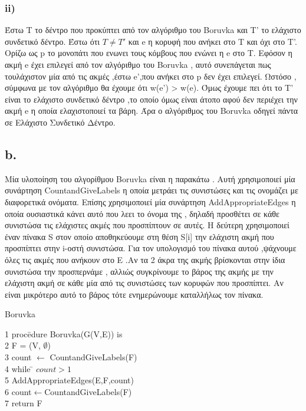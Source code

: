 \documentclass[12pt,a4paper]{article}
\begin{document}
\subsubsection*{ii)}

Έστω Τ το δέντρο που προκύπτει από τον αλγόριθμο του Boruvka και Τ' το ελάχιστο συνδετικό δέντρο. Έστω ότι $Τ \ne T'$ και e η κορυφή που ανήκει στο Τ και όχι στο Τ'. Ορίζω ως p το μονοπάτι που ενωνει τους κόμβους που ενώνει η e στο Τ. Εφόσον η ακμή e έχει επιλεγεί από τον αλγόριθμο του Boruvka , αυτό συνεπάγεται πως τουλάχιστον μία από τις ακμές ,έστω e',που ανήκει στο p δεν έχει επιλεγεί. Ωστόσο , σύμφωνα με τον αλγόριθμο θα έχουμε ότι w(e') > w(e). Όμως έχουμε πει ότι το Τ' είναι το ελάχιστο συνδετικό δέντρο ,το οποίο όμως είναι άτοπο αφού δεν περιέχει την ακμή e η οποία ελαχιστοποιεί τα βάρη. Άρα ο αλγόριθμος του Boruvka οδηγεί πάντα σε Ελάχιστο Συνδετικό Δέντρο.

\subsection*{b.}
Μία υλοποίηση του αλγορίθμου Boruvka είναι η παρακάτω . Αυτή χρησιμοποιεί μία συνάρτηση CountandGiveLabels η οποία μετράει τις συνιστώσες και τις ονομάζει με διαφορετικά ονόματα. Επίσης χρησιμοποιεί μία συνάρτηση AddAppropriateEdges η οποία ουσιαστικά κάνει αυτό που λεει το όνομα της , δηλαδή προσθέτει σε κάθε συνιστώσα τις ελάχιστες ακμές που προσπίπτουν σε αυτές. Η δεύτερη χρησιμοποιεί έναν πίνακα S στον οποίο αποθηκεύουμε στη θέση S[i] την ελάχιστη ακμή που προσπίπτει στην i-οστή συνιστώσα. Για τον υπολογισμό του πίνακα αυτού ,ψάχνουμε όλες τις ακμές που ανήκουν στο Ε .Αν τα 2 άκρα της ακμής βρίσκονται στην ίδια συνιστώσα την προσπερνάμε , αλλιώς συγκρίνουμε το βάρος της ακμής με την ελάχιστη ακμή σε κάθε μία από τις συνιστώσες των κορυφών που προσπίπτει. Αν είναι μικρότερο αυτό το βάρος τότε ενημερώνουμε καταλλήλως τον πίνακα.

\begin{mybox}{Boruvka}
    \begin{tabbing}
1    proc\=edure Boruvka(G(V,E)) is\\
2        \>F = (V, $\emptyset$)\\
3        \>count $\leftarrow$ CountandGiveLabels(F) \\
4        \>while \= $count > 1$ \\
5        \>\>AddAppropriateEdges(E,F,count)\\
6        \>\>count$\leftarrow$CountandGiveLabels(F)\\
7        \>return F
    \end{tabbing}
\end{mybox}
    
\end{document}
